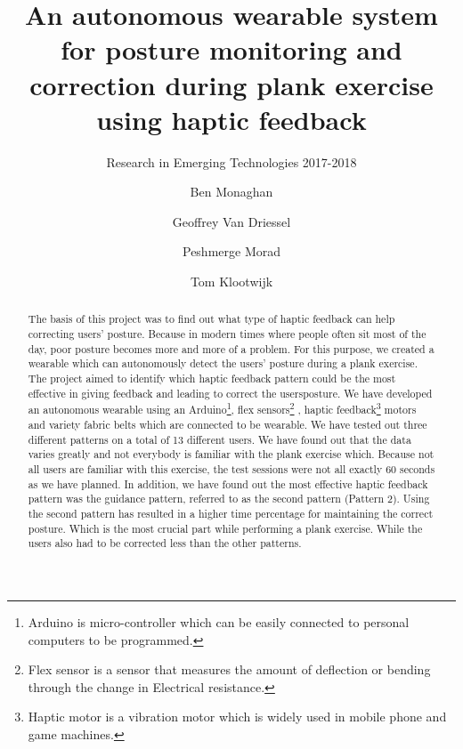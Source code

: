 \documentclass[sigconf]{acmart}
\begin{document}
\title{An autonomous wearable system for posture monitoring and correction during plank exercise using haptic feedback}
\subtitle{Research in Emerging Technologies 2017-2018 }


\author{Ben Monaghan}


\author{Geoffrey Van Driessel}

\author{Peshmerge Morad}

\author{Tom Klootwijk}

\begin{abstract}
The basis of this project was to find out what type of haptic feedback can help correcting users' posture. Because in modern times where people often sit most of the day, poor posture becomes more and more of a problem. For this purpose, we created a wearable which can autonomously detect the users' posture during a plank exercise. The project aimed to identify which haptic feedback pattern could be the most effective in giving feedback and leading to correct the users\textquotesingle  posture. We have developed an autonomous wearable using an Arduino\footnote{Arduino is micro-controller which can be easily connected to personal computers to be programmed.}, flex sensors\footnote{Flex sensor is a sensor that measures the amount of deflection or bending through the change in Electrical resistance.} , haptic feedback\footnote{Haptic motor is a vibration motor which is widely used in mobile phone and game machines.} motors  and variety fabric belts which are connected to be wearable. We have tested out three different patterns on a total of 13 different users. We have found out that the data varies greatly and not everybody is familiar with the plank exercise which. Because not all users are familiar with this exercise, the test sessions were not all exactly 60 seconds as we have planned. In addition, we have found out the most effective haptic feedback pattern was the guidance pattern, referred to as the second pattern (Pattern 2). Using the second pattern has resulted in a higher time percentage for maintaining the correct posture. Which is the most crucial part while performing a plank exercise. While the users also had to be corrected less than the other patterns.
\end{abstract}
\end{document}
